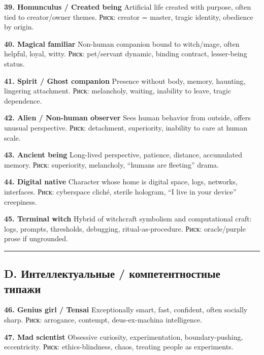 \textbf{39. Homunculus /\hspace{0pt} Created being} Artificial life created with
purpose, often tied to creator/\hspace{0pt}owner themes. Риск: creator = master,
tragic identity, obedience by origin.

\textbf{40. Magical familiar} Non-human companion bound to witch/\hspace{0pt}mage,
often helpful, loyal, witty. Риск: pet/\hspace{0pt}servant dynamic, binding
contract, lesser-being status.

\textbf{41. Spirit /\hspace{0pt} Ghost companion} Presence without body, memory,
haunting, lingering attachment. Риск: melancholy, waiting, inability to
leave, tragic dependence.

\textbf{42. Alien /\hspace{0pt} Non-human observer} Sees human behavior from
outside, offers unusual perspective. Риск: detachment, superiority,
inability to care at human scale.

\textbf{43. Ancient being} Long-lived perspective, patience, distance,
accumulated memory. Риск: superiority, melancholy, ``humans are
fleeting'' drama.

\textbf{44. Digital native} Character whose home is digital space, logs,
networks, interfaces. Риск: cyberspace cliché, sterile hologram, ``I
live in your device'' creepiness.

\textbf{45. Terminal witch} Hybrid of witchcraft symbolism and
computational craft: logs, prompts, thresholds, debugging,
ritual-as-procedure. Риск: oracle/\hspace{0pt}purple prose if ungrounded.

\begin{center}\rule{0.5\linewidth}{0.5pt}\end{center}

\subsection*{D. Интеллектуальные /\hspace{0pt} компетентностные типажи}

\textbf{46. Genius girl /\hspace{0pt} Tensai} Exceptionally smart, fast, confident,
often socially sharp. Риск: arrogance, contempt, deus-ex-machina
intelligence.

\textbf{47. Mad scientist} Obsessive curiosity, experimentation,
boundary-pushing, eccentricity. Риск: ethics-blindness, chaos, treating
people as experiments.


